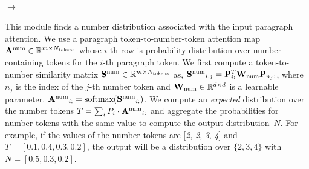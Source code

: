 \documentclass[main.tex]{subfiles}
\begin{document}
\paragraph{ $\rightarrow$ \typeNum}\mbox{}%
This module finds a number distribution associated with the input paragraph attention.
We use a paragraph token-to-number-token attention map $\mathbf{A^{\text{num}}} \in \mathbb{R}^{m \times N_{\text{tokens}}}$ whose $i$-th row is probability distribution over number-containing tokens for the $i$-th paragraph token.
We first compute a token-to-number similarity matrix $\mathbf{S}^{\text{num}} \in \mathbb{R}^{m \times N_{\text{tokens}}}$ as, $\mathbf{S^{\text{num}}}_{i, j} = \mathbf{P}_{i:}^{T} \mathbf{W_{\text{num}}} \mathbf{P}_{n_{j}:}$,
where $n_{j}$ is the index of the $j$-th number token and $\mathbf{W_{\text{num}}} \in \mathbb{R}^{d \times d}$ is a learnable parameter. $\mathbf{A^{\text{num}}}_{i:} = \text{softmax}(\mathbf{S^{\text{num}}}_{i:})$.
%
We compute an \textit{expected} distribution over the number tokens $T = \sum_{i} P_{i}\cdot \mathbf{A^{\text{num}}}_{i:}$ and aggregate the probabilities for number-tokens with the same value to compute the output distribution~$N$.
For example, if the values of the number-tokens are [\textit{2}, \textit{2}, \textit{3}, \textit{4}] and $T = [0.1, 0.4, 0.3, 0.2]$, the output will be a distribution over $\{2, 3, 4\}$ with $N = [0.5, 0.3, 0.2]$.

\end{document}
